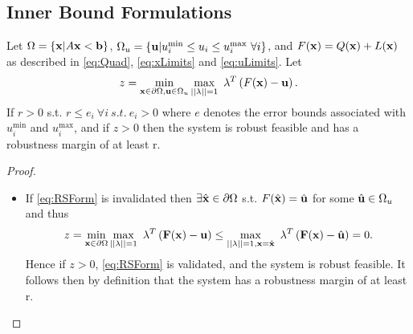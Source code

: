 \subsection{Inner Bound Formulations} \label{ssec:inbdform}


\begin{thm}
Let $\Omega=\{\bold x| A\bold x< \bold b\}$, $\Omega_{u}=\{\bold u| u^{\min}_i\leq u_i \leq u^{\max}_i \ \forall i \}$, and $F(\bold x)=Q(\bold x)+L(\bold x)$ as described in \eqref{eq:Quad}, \eqref{eq:xLimits} and \eqref{eq:uLimits}. 
Let
$$z = \min\limits_{\bold x\in \partial \Omega, \bold u\in \Omega_{u} }\max\limits_{||\bold{\lambda}||=1}\ \bold{\lambda}^T\left(F(\bold x)-\bold u\right).$$
If $r>0$ s.t. $r\leq e_i \ \forall i \ s.t. \ e_i>0$ where $e$ denotes the error bounds associated with $ u^{\min}_i$ and $ u^{\max}_i$, and if $z>0$ then the system is robust feasible and has a robustness margin of at least r.

\begin{proof} \ \\
\begin{itemize}
\item[] If \eqref{eq:RSForm} is invalidated then $\exists \hat{\bold x}\in\partial\Omega$ s.t. $F(\hat{\bold x})=\hat{\bold u}$ for some $\hat{\bold u}\in\Omega_{u}$ and thus $$z = \min\limits_{\bold x\in \partial \Omega}\max\limits_{||\bold{\lambda}||=1}\ \bold{\lambda}^T\left(\bold{F}(\bold x)-\bold u\right)\leq \max\limits_{||\bold{\lambda}||=1, \bold x=\hat{\bold x}}\ \bold{\lambda}^T\left(\bold{F}(\bold x)-\hat{\bold u}\right)=0.$$ 
Hence if $z>0$, \eqref{eq:RSForm} is validated, and the system is robust feasible. It follows then by definition that the system has a robustness margin of at least r.
\end{itemize}
\end{proof}
\end{thm}

